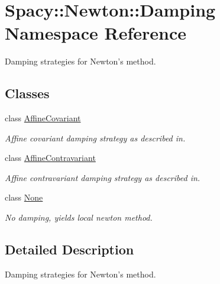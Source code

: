 \hypertarget{namespaceSpacy_1_1Newton_1_1Damping}{\section{\-Spacy\-:\-:\-Newton\-:\-:\-Damping \-Namespace \-Reference}
\label{namespaceSpacy_1_1Newton_1_1Damping}
}


\-Damping strategies for \-Newton's method.  


\subsection*{\-Classes}
\begin{DoxyCompactItemize}
\item 
class \hyperlink{classSpacy_1_1Newton_1_1Damping_1_1AffineCovariant}{\-Affine\-Covariant}
\begin{DoxyCompactList}\small\item\em \-Affine covariant damping strategy as described in. \end{DoxyCompactList}\item 
class \hyperlink{classSpacy_1_1Newton_1_1Damping_1_1AffineContravariant}{\-Affine\-Contravariant}
\begin{DoxyCompactList}\small\item\em \-Affine contravariant damping strategy as described in. \end{DoxyCompactList}\item 
class \hyperlink{classSpacy_1_1Newton_1_1Damping_1_1None}{\-None}
\begin{DoxyCompactList}\small\item\em \-No damping, yields local newton method. \end{DoxyCompactList}\end{DoxyCompactItemize}


\subsection{\-Detailed \-Description}
\-Damping strategies for \-Newton's method. 